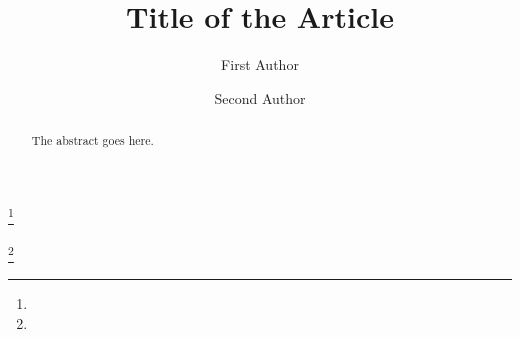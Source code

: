 \documentclass{amsart}
\theoremstyle{definition}
\theoremstyle{remark}
\numberwithin{equation}{section}
\begin{document}
\title{Title of the Article}


\author{First Author}
\address{Department of Mathematics, University}
\curraddr{}
\email{}
\thanks{}

\author{Second Author}
\address{Department of Mathematics, University}
\curraddr{}
\email{}
\thanks{}


\keywords{}

\date{}

\dedicatory{}

\begin{abstract}
The abstract goes here.
\end{abstract}

\maketitle
\end{document}
